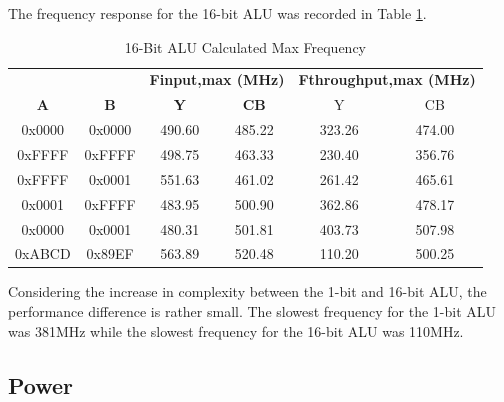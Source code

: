 \documentclass[11pt]{article}
\begin{document}
			The frequency response for the 16-bit ALU was recorded in Table \ref{tab:ALU-16-Bit-Freq}.
		
			\begin{table}[H]
				\centering
				\caption{16-Bit ALU Calculated Max Frequency}
				\label{tab:ALU-16-Bit-Freq}
				\begin{tabular}{|cc|cc|cc|}
					\hline
					\multicolumn{1}{|c}{\textbf{}}  & \multicolumn{1}{c}{\textbf{}}  & \multicolumn{2}{|c|}{\textbf{Finput,max (MHz)}} & \multicolumn{2}{c|}{\textbf{Fthroughput,max (MHz)}} \\
					\textbf{A} & \textbf{B} & \textbf{Y}            & \textbf{CB}           & Y                        & CB                      \\
					\hline
					0x0000     & 0x0000     & 490.60                & 485.22                & 323.26                   & 474.00                  \\
					0xFFFF                         & 0xFFFF                         & 498.75                & 463.33                & 230.40                   & 356.76                  \\
					0xFFFF                         & 0x0001                         & 551.63                & 461.02                & 261.42                   & 465.61                  \\
					0x0001                         & 0xFFFF                         & 483.95                & 500.90                & 362.86                   & 478.17                  \\
					0x0000                         & 0x0001                         & 480.31                & 501.81                & 403.73                   & 507.98                  \\
					0xABCD                         & 0x89EF                         & 563.89                & 520.48                & 110.20                   & 500.25                 \\
					\hline
				\end{tabular}
			\end{table}
		
			Considering the increase in complexity between the 1-bit and 16-bit ALU, the performance difference is  rather small. The slowest frequency for the 1-bit ALU was 381MHz while the slowest frequency for the 16-bit ALU was 110MHz.
	
	\subsection{Power}
	
\end{document}
